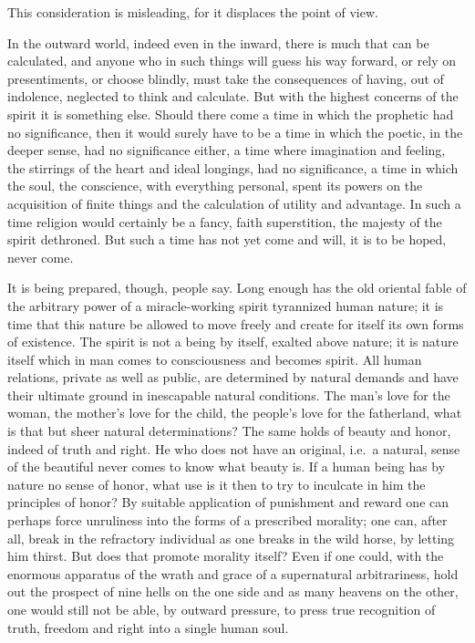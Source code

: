 \documentclass[12pt,a4paper,openany]{book}
\newcommand{\opage}[1]{\marginnote{\footnotesize\textit{[#1]}}}
\begin{document}
This consideration is misleading, for it displaces
the point of view.

In the outward world, indeed even in the inward, there is
much that can be calculated, and anyone who in such
things will guess his way forward, or rely on presentiments, or
choose blindly, must take the consequences of having, out of indolence,
neglected to think and calculate. But with
the highest concerns of the spirit it is something else.
Should there come a time in which the prophetic
had no significance, then it would surely have to be a time
in which the poetic, in the deeper sense, had no significance
either, a time where imagination and feeling, the stirrings
of the heart and ideal longings, had no significance,
a time in which the soul, the conscience, with everything personal,
spent its powers on the acquisition of finite
things and the calculation of utility and advantage. In such a
time religion would certainly be a fancy,
faith superstition, the majesty of the spirit dethroned. But
such a time has not yet come and will, it is to be hoped,
never come.

\setcounter{footnote}{0}%
\opage{4}It is being prepared, though, people say. Long enough has
the old oriental fable of the arbitrary power of a miracle-working
spirit tyrannized human
nature; it is time that this nature be allowed to
move freely and create for itself its own forms of existence.
The spirit is not a being by itself, exalted
above nature; it is nature itself which in man
comes to consciousness and becomes spirit. All human
relations, private as well as public, are determined
by natural demands and have their ultimate ground in inescapable
natural conditions. The man's love for the woman,
the mother's love for the child, the people's love for
the fatherland, what is that but sheer natural determinations?
The same holds of beauty and
honor, indeed of truth and right. He who does not have an
original, i.e.\ a natural, sense of the beautiful
never comes to know what beauty is. If a
human being has by nature no sense of honor, what use is
it then to try to inculcate in him the principles of honor?
By suitable application of punishment and reward
one can perhaps force unruliness into the forms of a prescribed
morality; one can, after all, break in the refractory
individual as one breaks in the wild horse, by letting
him thirst. But does that promote morality itself? Even if
one could, with the enormous apparatus of the wrath and grace of a supernatural
arbitrariness, hold out the prospect of nine hells
on the one side and as many heavens on
the other, one would still not be able, by outward
pressure, to press true recognition of truth,
freedom and right into a single human soul.
\end{document}
